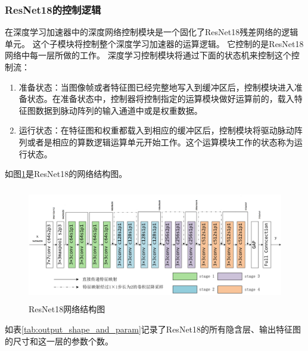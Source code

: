 \subsubsection{ResNet18的控制逻辑}
在深度学习加速器中的深度网络控制模块是一个固化了ResNet18残差网络\cite{resnet2015}的逻辑单元。
这个子模块将控制整个深度学习加速器的运算逻辑。
它控制的是ResNet18网络中每一层所做的工作。
深度学习控制模块将通过下面的状态机来控制这个控制流：
\begin{enumerate}
    \item 准备状态：当图像帧或者特征图已经完整地写入到缓冲区后，控制模块进入准备状态。在准备状态中，控制器将控制指定的运算模块做好运算前的，载入特征图数据到脉动阵列的输入通道中或是权重数据。
    \item 运行状态：在特征图和权重都载入到相应的缓冲区后，控制模块将驱动脉动阵列或者是相应的算数逻辑运算单元开始工作。这个运算模块工作的状态称为运行状态。
\end{enumerate}  
如图\ref{fig:resnet18_arch}是ResNet18的网络结构图。
\begin{figure}[htbp]
    \centering
    \includegraphics[width=12cm,height=5cm]{figures/resnet18_arch.png}
    \caption{ResNet18网络结构图}
    \label{fig:resnet18_arch}
\end{figure}

如表\ref{tab:output_shape_and_param}记录了ResNet18的所有隐含层、输出特征图的尺寸和这一层的参数个数。

